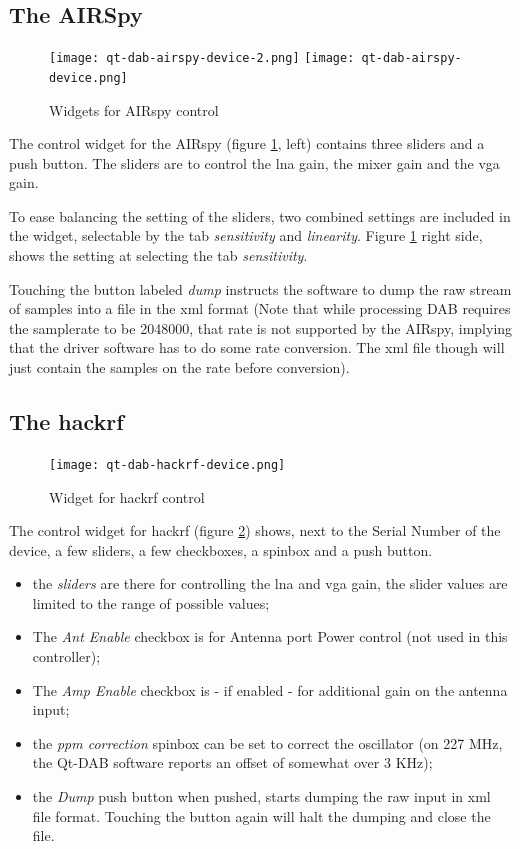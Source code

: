 \documentclass[12pt]{article}
\begin{document}
\subsection{The AIRSpy}
\begin{figure}[htp]
\centering
\texttt{[image: qt-dab-airspy-device-2.png]}
\texttt{[image: qt-dab-airspy-device.png]}
\caption{Widgets for AIRspy control}
\label{figure:airspy-1}
\end{figure}
The control widget for the AIRspy (figure \ref{figure:airspy-1}, left)
 contains three sliders and a push button.
The sliders are to control the lna gain, the mixer gain and the vga gain.
\par
To ease balancing the setting of the sliders, two combined settings
are included in the widget, selectable by the tab {\em sensitivity} and 
{\em linearity}. Figure \ref{figure:airspy-1} right side, shows
the setting at selecting the tab {\em sensitivity}.
\par
Touching the button labeled {\em dump} instructs the software to dump
the raw stream of samples into a file in the xml format (Note that
while processing DAB requires the samplerate to be 2048000, that rate
is not supported by the AIRspy, implying that the driver software has to
do some rate conversion. The xml file though will just contain the
samples on the rate before conversion).
\subsection{The hackrf}
\begin{figure}[htp]
\centering
\texttt{[image: qt-dab-hackrf-device.png]}
\caption{Widget for hackrf control}
\label{figure:hackrf}
\end{figure}
The control widget for hackrf (figure \ref{figure:hackrf}) shows,
next to the Serial Number of the device, a few sliders, a few checkboxes,
a spinbox and a push button.
\begin{itemize}
\item the {\em sliders} are there for controlling the lna and vga gain,
the slider values are limited to the range of possible values;
\item The {\em Ant Enable} checkbox is for Antenna port Power control (not used in this controller);
\item The {\em Amp Enable} checkbox is - if enabled - for additional gain
on the antenna input;
\item the {\em ppm correction} spinbox can be set to correct the oscillator
(on 227 MHz, the Qt-DAB software reports an offset of somewhat over 3 KHz);
\item the {\em Dump} push button when pushed, starts dumping the raw input in
xml file format. Touching the button again will halt the dumping and
close the file.
\end{itemize}
\end{document}
